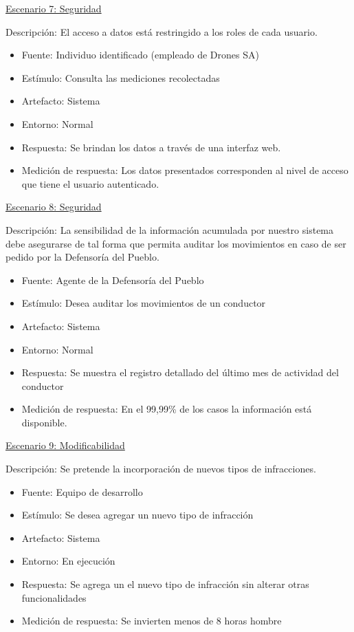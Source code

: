 \underline{Escenario 7: Seguridad}


Descripción: El acceso a datos está restringido a los roles de cada usuario.
\begin{itemize}
\item Fuente: Individuo identificado (empleado de Drones SA)
\item Estímulo: Consulta las mediciones recolectadas
\item Artefacto: Sistema
\item Entorno: Normal
\item Respuesta: Se brindan los datos a través de una interfaz web. 
\item Medición de respuesta: Los datos presentados corresponden al nivel de acceso que tiene el usuario autenticado.
\end{itemize} 

\underline{Escenario 8: Seguridad}


Descripción: La sensibilidad de la información acumulada por nuestro sistema debe asegurarse de tal forma que permita auditar los 
movimientos en caso de ser pedido por la Defensoría del Pueblo.
\begin{itemize}
\item Fuente: Agente de la Defensoría del Pueblo
\item Estímulo: Desea auditar los movimientos de un conductor
\item Artefacto: Sistema
\item Entorno: Normal
\item Respuesta: Se muestra el registro detallado del último mes de actividad del conductor
\item Medición de respuesta: En el 99,99\% de los casos la información está disponible.
\end{itemize}


\underline{Escenario 9: Modificabilidad}


Descripción: Se pretende la incorporación de nuevos tipos de infracciones.
\begin{itemize}
\item Fuente: Equipo de desarrollo
\item Estímulo: Se desea agregar un nuevo tipo de infracción
\item Artefacto: Sistema
\item Entorno: En ejecución
\item Respuesta: Se agrega un el nuevo tipo de infracción sin alterar otras funcionalidades 
\item Medición de respuesta: Se invierten menos de 8 horas hombre
\end{itemize} 


